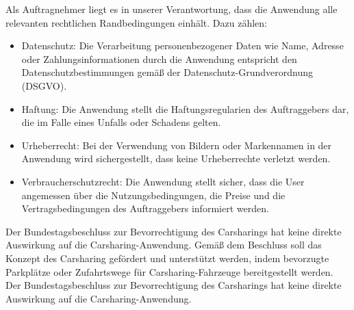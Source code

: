 Als Auftragnehmer liegt es in unserer Verantwortung, dass die Anwendung alle relevanten rechtlichen Randbedingungen einhält.
Dazu zählen: \medskip
\begin{itemize}
    \item Datenschutz: Die Verarbeitung personenbezogener Daten wie Name, Adresse oder Zahlungsinformationen durch die Anwendung entspricht den Datenschutzbestimmungen gemäß der Datenschutz-Grundverordnung (DSGVO).
    \item Haftung: Die Anwendung stellt die Haftungsregularien des Auftraggebers dar, die im Falle eines Unfalls oder Schadens gelten.
    \item Urheberrecht: Bei der Verwendung von Bildern oder Markennamen in der Anwendung wird sichergestellt, dass keine Urheberrechte verletzt werden.
    \item Verbraucherschutzrecht: Die Anwendung stellt sicher, dass die User angemessen über die Nutzungsbedingungen, die Preise und die Vertragsbedingungen des Auftraggebers informiert werden.
\end{itemize}

Der Bundestagsbeschluss zur Bevorrechtigung des Carsharings hat keine direkte Auswirkung auf die Carsharing-Anwendung.
Gemäß dem Beschluss soll das Konzept des Carsharing gefördert und unterstützt werden, indem bevorzugte Parkplätze oder Zufahrtswege für Carsharing-Fahrzeuge bereitgestellt werden.
Der Bundestagsbeschluss zur Bevorrechtigung des Carsharings hat keine direkte Auswirkung auf die Carsharing-Anwendung.